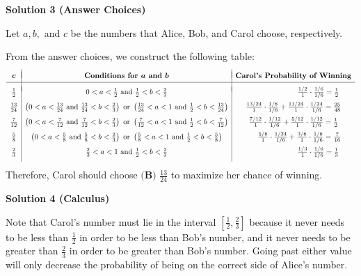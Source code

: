 \begin{enumerate}
\textbf{Solution 3 (Answer Choices)}

Let $a,b,$ and $c$ be the numbers that Alice, Bob, and Carol choose, respectively.

 From the answer choices, we construct the following table:
 \[\begin{array}{c|c|c} & & \\ [-2ex] \boldsymbol{c} & \textbf{Conditions for }\boldsymbol{a}\textbf{ and }\boldsymbol{b} & \textbf{Carol's Probability of Winning} \\ [0.5ex] \hline & & \\ [-1.5ex] \frac12 & 0<a<\frac12 \text{ and } \frac12<b<\frac23 & \hspace{23.375mm}\frac{1/2}{1}\cdot\frac{1/6}{1/6}=\frac12 \\ [1.5ex] \frac{13}{24} & \left(0<a<\frac{13}{24} \text{ and } \frac{13}{24}<b<\frac23\right) \text{ or } \left(\frac{13}{24}<a<1 \text{ and } \frac12<b<\frac{13}{24}\right) & \frac{13/24}{1}\cdot\frac{1/8}{1/6}+\frac{11/24}{1}\cdot\frac{1/24}{1/6}=\frac{25}{48} \\ [1.5ex] \frac{7}{12} & \left(0<a<\frac{7}{12} \text{ and } \frac{7}{12}<b<\frac23\right) \text{ or } \left(\frac{7}{12}<a<1 \text{ and } \frac12<b<\frac{7}{12}\right) & \frac{7/12}{1}\cdot\frac{1/12}{1/6}+\frac{5/12}{1}\cdot\frac{1/12}{1/6}=\frac12 \\ [1.5ex] \frac58 & \left(0<a<\frac58 \text{ and } \frac58<b<\frac23\right) \text{ or } \left(\frac58<a<1 \text{ and } \frac12<b<\frac58\right) & \hspace{5.625mm}\frac{5/8}{1}\cdot\frac{1/24}{1/6}+\frac{3/8}{1}\cdot\frac{1/8}{1/6}=\frac{7}{16} \\ [1.5ex] \frac23 & \frac23<a<1 \text{ and } \frac12<b<\frac23 & \hspace{23.25mm}\frac{1/3}{1}\cdot\frac{1/6}{1/6}=\frac13 \\ [1.5ex] \end{array}\]Therefore, Carol should choose $\boxed{\textbf{(B) }\frac{13}{24}}$ to maximize her chance of winning.

 



\textbf{Solution 4 (Calculus)}

Note that Carol's number must lie in the interval $\left[\frac{1}{2}, \frac{2}{3}\right]$ because it never needs to be less than $\frac{1}{2}$ in order to be less than Bob's number, and it never needs to be greater than $\frac{2}{3}$ in order to be greater than Bob's number. Going past either value will only decrease the probability of being on the correct side of Alice's number.


\end{enumerate}
